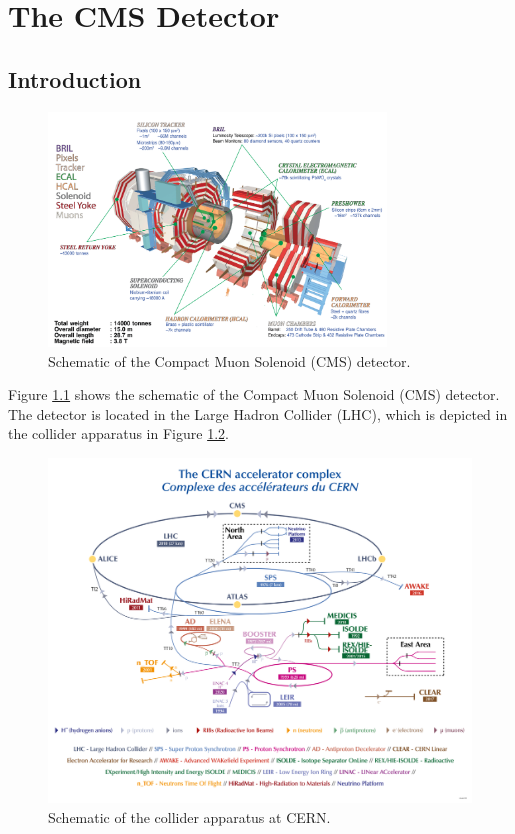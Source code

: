\chapter{The CMS Detector}\label{chap:cms}


\section{Introduction}\label{sec:ch3:intro}

 \begin{figure}[h]
\centering
\includegraphics[width=0.8\textwidth]{figures/cms_schematic.png}
\caption{Schematic of the Compact Muon Solenoid (CMS) detector.}
\label{fig:cms}
\end{figure}

Figure \ref{fig:cms} shows the schematic of the Compact Muon Solenoid (CMS) detector. The detector is located in the Large Hadron Collider (LHC), which is depicted in the collider apparatus in Figure \ref{fig:cern}.

 \begin{figure}[h]
\centering
\includegraphics[width=1.0\textwidth]{figures/CCC-v2022.png}
\caption{Schematic of the collider apparatus at CERN.}
\label{fig:cern}
\end{figure}


